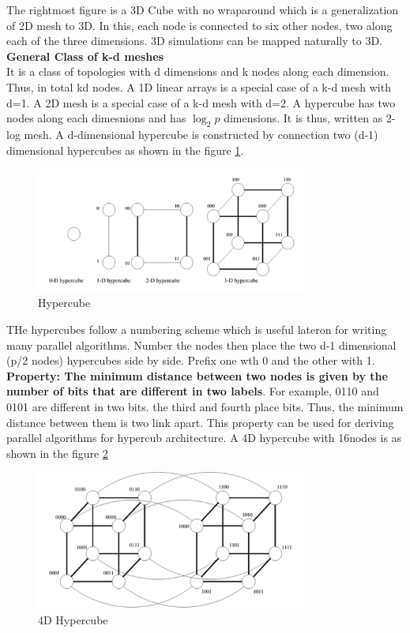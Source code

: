 \documentclass[12pt]{article}
\begin{document}
The rightmost figure is a 3D Cube with no wraparound which is a generalization of 2D mesh to 3D. In this, each node is connected to six other nodes, 
two along each of the three dimensions. 3D simulations can be mapped naturally to 3D.\\
\textbf{General Class of k-d meshes}\\
It is a class of topologies with d dimensions and k nodes along each dimension. Thus, in total kd nodes.
A 1D linear arrays is a special case of a k-d mesh with d=1. A 2D mesh is a special case of a k-d mesh with d=2.
A hypercube has two nodes along each dimesnions and has $\log_2 p$ dimensions. It is thus, written as 2-log mesh.
A d-dimensional hypercube is constructed by connection two (d-1) dimensional hypercubes as shown in the figure \ref{fig:hypercube}.
\begin{figure}[H]
    \centering
    \includegraphics[width=0.8\textwidth]{images/hypercube.png}
    \caption{Hypercube}
    \label{fig:hypercube}
\end{figure}
THe hypercubes follow a numbering scheme which is useful lateron for writing many parallel algorithms. 
Number the nodes then place the two d-1 dimensional (p/2 nodes) hypercubes side by side. Prefix one wth 0 and the other with 1.
\textbf{Property: The minimum distance between two nodes is given by the number of bits that are different in two labels}. For example,
0110 and 0101 are different in two bits. the third and fourth place bits. Thus, the minimum distance between them is two link apart. This property can 
be used for deriving parallel algorithms for hypercub architecture.
A 4D hypercube with 16nodes is as shown in the figure \ref{fig:4dhypercube}
\begin{figure}[H]
    \centering
    \includegraphics[width=0.8\textwidth]{images/4dhypercube.png}
    \caption{4D Hypercube}
    \label{fig:4dhypercube}
\end{figure}
\end{document}
